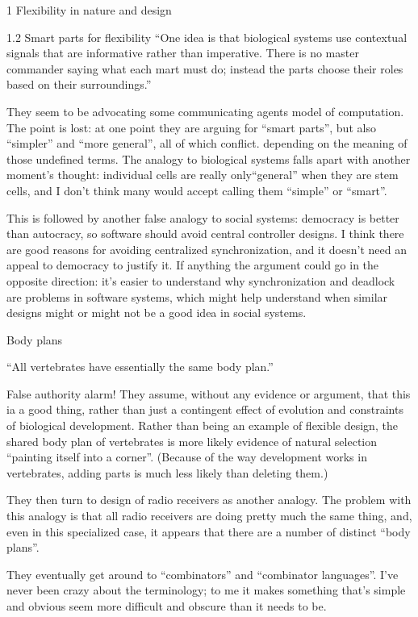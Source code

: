 \documentclass[12pt]{PalisadesLakesBook}
\begin{document}
\begin{plSection}{1 Flexibility in nature and design}
\begin{plSection}{1.2 Smart parts for flexibility}
``One idea is that biological systems use contextual signals
that are informative rather than imperative.
There is no master commander saying what each mart must do;
instead the parts choose their roles based on their surroundings.''

They seem to be advocating some communicating agents model
of computation.
The point is lost: at one point they are arguing for
``smart parts'', but also ``simpler'' and ``more general'',
all of which conflict. depending on the meaning of those
undefined terms. 
The analogy to biological systems falls apart with another
moment's thought: 
individual cells are really only``general''
when they are stem cells,
and I don't think many would accept calling them ``simple''
or ``smart''.

This is followed by another false analogy to social systems:
democracy is better than autocracy, 
so software should avoid central controller designs.
I think there are good reasons for avoiding 
centralized synchronization,
and it doesn't need an appeal to democracy to justify it.
If anything the argument could go in the opposite direction:
it's easier to understand why synchronization and deadlock
are problems in software systems, 
which might help understand when similar designs 
might or might not be a good idea in social systems.
 
\begin{plSection}{Body plans}

``All vertebrates have essentially the same body plan.''

False authority alarm! 
They assume, without any evidence or argument,
that this ia a good thing, 
rather than just a contingent effect of 
evolution and constraints of biological development.
Rather than being an example of flexible design,
the shared body plan of vertebrates
is more likely evidence of natural selection
``painting itself into a corner''.
(Because of the way development works in vertebrates,
adding parts is much less likely than deleting them.)

They then turn to design of radio receivers as another analogy.
The problem with this analogy is that all radio receivers
are doing pretty much the same thing,
and, even in this specialized case, 
it appears that there are a number of distinct ``body plans''.

They eventually get around to ``combinators''
and ``combinator languages''.
I've never been crazy about the terminology;
to me it makes something that's simple and obvious 
seem more difficult
and obscure than it needs to be.


\end{plSection}
\end{plSection}
\end{plSection}
\end{document}

